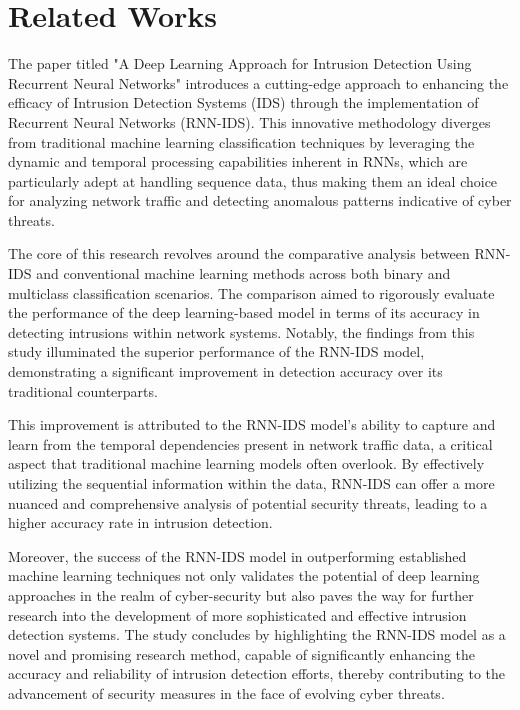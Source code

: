 \section{Related Works}
\vspace{-18pt}
The paper titled "A Deep Learning Approach for Intrusion Detection Using Recurrent Neural Networks" introduces a cutting-edge approach to enhancing the efficacy of Intrusion Detection Systems (IDS) through the implementation of Recurrent Neural Networks (RNN-IDS). This innovative methodology diverges from traditional machine learning classification techniques by leveraging the dynamic and temporal processing capabilities inherent in RNNs, which are particularly adept at handling sequence data, thus making them an ideal choice for analyzing network traffic and detecting anomalous patterns indicative of cyber threats.\par
The core of this research revolves around the comparative analysis between RNN-IDS and conventional machine learning methods across both binary and multiclass classification scenarios. The comparison aimed to rigorously evaluate the performance of the deep learning-based model in terms of its accuracy in detecting intrusions within network systems. Notably, the findings from this study illuminated the superior performance of the RNN-IDS model, demonstrating a significant improvement in detection accuracy over its traditional counterparts.\par 
This improvement is attributed to the RNN-IDS model's ability to capture and learn from the temporal dependencies present in network traffic data, a critical aspect that traditional machine learning models often overlook. By effectively utilizing the sequential information within the data, RNN-IDS can offer a more nuanced and comprehensive analysis of potential security threats, leading to a higher accuracy rate in intrusion detection.\par 
Moreover, the success of the RNN-IDS model in outperforming established machine learning techniques not only validates the potential of deep learning approaches in the realm of cyber-security but also paves the way for further research into the development of more sophisticated and effective intrusion detection systems. The study concludes by highlighting the RNN-IDS model as a novel and promising research method, capable of significantly enhancing the accuracy and reliability of intrusion detection efforts, thereby contributing to the advancement of security measures in the face of evolving cyber threats\cite{yin2017deep}.
